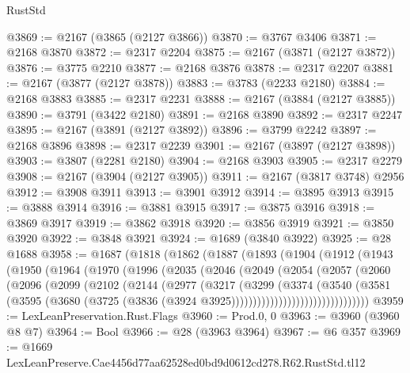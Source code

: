 \begin{lexlean}{RustStd}
\begin{coremodule}
@3869 := @2167 (@3865 (@2127 @3866))
@3870 := @3767 @3406
@3871 := @2168 @3870
@3872 := @2317 @2204
@3875 := @2167 (@3871 (@2127 @3872))
@3876 := @3775 @2210
@3877 := @2168 @3876
@3878 := @2317 @2207
@3881 := @2167 (@3877 (@2127 @3878))
@3883 := @3783 (@2233 @2180)
@3884 := @2168 @3883
@3885 := @2317 @2231
@3888 := @2167 (@3884 (@2127 @3885))
@3890 := @3791 (@3422 @2180)
@3891 := @2168 @3890
@3892 := @2317 @2247
@3895 := @2167 (@3891 (@2127 @3892))
@3896 := @3799 @2242
@3897 := @2168 @3896
@3898 := @2317 @2239
@3901 := @2167 (@3897 (@2127 @3898))
@3903 := @3807 (@2281 @2180)
@3904 := @2168 @3903
@3905 := @2317 @2279
@3908 := @2167 (@3904 (@2127 @3905))
@3911 := @2167 (@3817 @3748) @2956
@3912 := @3908 @3911
@3913 := @3901 @3912
@3914 := @3895 @3913
@3915 := @3888 @3914
@3916 := @3881 @3915
@3917 := @3875 @3916
@3918 := @3869 @3917
@3919 := @3862 @3918
@3920 := @3856 @3919
@3921 := @3850 @3920
@3922 := @3848 @3921
@3924 := @1689 (@3840 @3922)
@3925 := @28 @1688
@3958 := @1687
    (@1818
      (@1862
        (@1887
          (@1893
            (@1904
              (@1912
                (@1943
                  (@1950
                    (@1964
                      (@1970
                        (@1996
                          (@2035
                            (@2046
                              (@2049
                                (@2054
                                  (@2057
                                    (@2060
                                      (@2096
                                        (@2099
                                          (@2102
                                            (@2144
                                              (@2977
                                                (@3217
                                                  (@3299
                                                    (@3374
                                                      (@3540
                                                        (@3581
                                                          (@3595
                                                            (@3680
                                                              (@3725
                                                                (@3836
                                                                  (@3924
                                                                    @3925))))))))))))))))))))))))))))))))
@3959 := LexLeanPreservation.Rust.Flags
@3960 := Prod.{0, 0}
@3963 := @3960 (@3960 @8 @7)
@3964 := Bool
@3966 := @28 (@3963 @3964)
@3967 := @6 @357
@3969 := @1669 LexLeanPreserve.Cae4456d77aa62528ed0bd9d0612cd278.R62.RustStd.tl12

\end{coremodule}
\end{lexlean}
